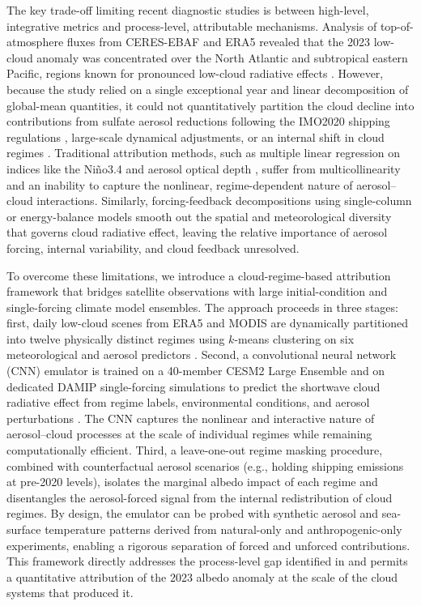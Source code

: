 \documentclass{article}
\begin{document}
The key trade-off limiting recent diagnostic studies is between high-level, integrative metrics and process-level, attributable mechanisms. 
Analysis of top-of-atmosphere fluxes from CERES-EBAF and ERA5 revealed that the 2023 low-cloud anomaly was concentrated over the North Atlantic and subtropical eastern Pacific, regions known for pronounced low-cloud radiative effects \cite{mccoy2020observed,goessling2024recent}. 
However, because the study relied on a single exceptional year and linear decomposition of global-mean quantities, it could not quantitatively partition the cloud decline into contributions from sulfate aerosol reductions following the IMO2020 shipping regulations \cite{yuan2022global,diamond2023radiative}, large-scale dynamical adjustments, or an internal shift in cloud regimes \cite{amaya2024tropical}. 
Traditional attribution methods, such as multiple linear regression on indices like the Ni\~no3.4 and aerosol optical depth \cite{allen1999checking,riesenberger2010global}, suffer from multicollinearity and an inability to capture the nonlinear, regime-dependent nature of aerosol–cloud interactions. 
Similarly, forcing-feedback decompositions using single-column or energy-balance models \cite{bellouin2020bounding,forster2021indicators} smooth out the spatial and meteorological diversity that governs cloud radiative effect, leaving the relative importance of aerosol forcing, internal variability, and cloud feedback unresolved.

To overcome these limitations, we introduce a cloud-regime-based attribution framework that bridges satellite observations with large initial-condition and single-forcing climate model ensembles. 
The approach proceeds in three stages: first, daily low-cloud scenes from ERA5 and MODIS are dynamically partitioned into twelve physically distinct regimes using $k$-means clustering on six meteorological and aerosol predictors \cite{tselioudis2021weather}. 
Second, a convolutional neural network (CNN) emulator is trained on a 40-member CESM2 Large Ensemble and on dedicated DAMIP single-forcing simulations to predict the shortwave cloud radiative effect from regime labels, environmental conditions, and aerosol perturbations \cite{beucler2021machine,barnes2019viewing}. 
The CNN captures the nonlinear and interactive nature of aerosol–cloud processes at the scale of individual regimes while remaining computationally efficient. 
Third, a leave-one-out regime masking procedure, combined with counterfactual aerosol scenarios (e.g., holding shipping emissions at pre-2020 levels), isolates the marginal albedo impact of each regime and disentangles the aerosol-forced signal from the internal redistribution of cloud regimes. 
By design, the emulator can be probed with synthetic aerosol and sea-surface temperature patterns derived from natural-only and anthropogenic-only experiments, enabling a rigorous separation of forced and unforced contributions. 
This framework directly addresses the process-level gap identified in \cite{goessling2024recent} and permits a quantitative attribution of the 2023 albedo anomaly at the scale of the cloud systems that produced it.
\end{document}
